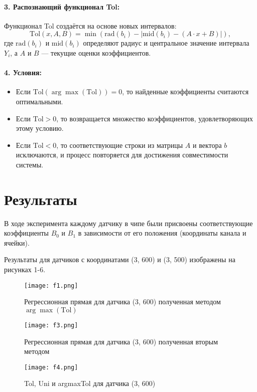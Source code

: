 \documentclass[a4paper,14pt]{extarticle}
\begin{document}
\paragraph{3. Распознающий функционал Tol:}
Функционал Tol создаётся на основе новых интервалов:
\[
\text{Tol}(x, A, B) = \min \left( \text{rad}(b_i) - \left| \text{mid}(b_i) - (A \cdot x + B) \right| \right),
\]
где $\text{rad}(b_i)$ и $\text{mid}(b_i)$ определяют радиус и центральное значение интервала $Y_i$, а $A$ и $B$ — текущие оценки коэффициентов.

\paragraph{4. Условия:}
\begin{itemize}
    \item Если $\text{Tol}(\arg\max(\text{Tol})) = 0$, то найденные коэффициенты считаются оптимальными.
    \item Если $\text{Tol} > 0$, то возвращается множество коэффициентов, удовлетворяющих этому условию.
    \item Если $\text{Tol} < 0$, то соответствующие строки из матрицы $A$ и вектора $b$ исключаются, и процесс повторяется для достижения совместимости системы.
\end{itemize}

\section{Результаты}
В ходе эксперимента каждому датчику в чипе были присвоены соответствующие коэффициенты $B_0$ и $B_1$ в зависимости от его положения (координаты канала и ячейки).

Результаты для датчиков с координатами (3, 600) и (3, 500) изображены на рисунках 1-6.
\clearpage
\begin{figure}[htbp]
    \centering
    \texttt{[image: f1.png]}
    \caption{Регрессионная прямая для датчика (3, 600) полученная методом $\arg\max(\text{Tol})$}
    \label{fig:hamiltonianGraph}
\end{figure}

\begin{figure}[htbp]
    \centering
    \texttt{[image: f3.png]}
    \caption{Регрессионная прямая для датчика (3, 600) полученная вторым методом}
    \label{fig:hamiltonianGraph}
\end{figure}
\clearpage
\begin{figure}[htbp]
    \centering
    \texttt{[image: f4.png]}
    \caption{Tol, Uni и argmaxTol для датчика (3, 600)}
    \label{fig:hamiltonianGraph}
\end{figure}
\end{document}
